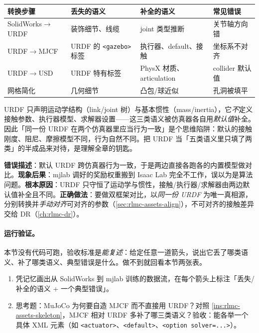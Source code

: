 \begin{center}
\small
\begin{tabular}{@{}llll@{}}
\toprule
转换步骤 & 丢失的语义 & 补全的语义 & 常见错误 \\
\midrule
SolidWorks$\to$URDF & 装饰细节、线缆 & joint 类型推断 & 关节轴方向错 \\
URDF$\to$MJCF & URDF 的 \texttt{<gazebo>} 标签 & 执行器、default、接触 & 坐标系不对齐 \\
URDF$\to$USD & URDF 特有标签 & PhysX 材质、articulation & collider 默认值 \\
网格简化 & 几何细节 & 凸包/球近似 & 孔洞被填平 \\
\bottomrule
\end{tabular}
\end{center}

\begin{insight}\label{ins:rlmc-assets-skeleton}
URDF 只声明运动学结构（link/joint 树）与基本惯性（mass/inertia），它\emph{不}定义接触参数、执行器模型、求解器设置——这三类语义被仿真器各自用\emph{默认值}补全。因此「同一份 URDF 在两个仿真器里应当行为一致」是个思维陷阱：默认的接触刚度、阻尼、摩擦模型不同，行为自然不同。把 URDF 当「五类语义里只填了两类」的半成品来对待，是理解全章的钥匙。
\end{insight}

\begin{pitfall}
\textbf{错误描述}：默认 URDF 跨仿真器行为一致，于是两边直接各跑各的内置模型做对比。\textbf{现象后果}：mjlab 调好的奖励权重搬到 Isaac Lab 完全不工作，误以为是算法问题。\textbf{根本原因}：URDF 只守恒了运动学与惯性，接触/执行器/求解器由两边默认值补全且不同。\textbf{正确做法}：要做双框架对比，以\emph{同一份 URDF} 为唯一真相源，分别转换并\emph{手动对齐}可对齐的参数（\cref{sec:rlmc-assets-align}），不可对齐的接触差异交给 DR（\cref{ch:rlmc-dr}）。
\end{pitfall}

\paragraph{运行验证。}本节没有代码可跑，验收标准是\emph{能复述}：给定任意一道箭头，说出它丢了哪类语义、补了哪类语义、典型错误是什么。做不到就回看本节两张表。

\begin{practice}[全链路自测]
\begin{enumerate}
  \item 凭记忆画出从 SolidWorks 到 mjlab 训练的数据流，在每个箭头上标注「丢失/补全的语义 + 一个典型错误」。
  \item 思考题：MuJoCo 为何要自造 MJCF 而不直接用 URDF？对照 \cref{ins:rlmc-assets-skeleton}，MJCF 相对 URDF 多补了哪三类语义？验收：能各举一个具体 XML 元素（如 \texttt{<actuator>}、\texttt{<default>}、\texttt{<option solver=...>}）。
\end{enumerate}
\end{practice}

